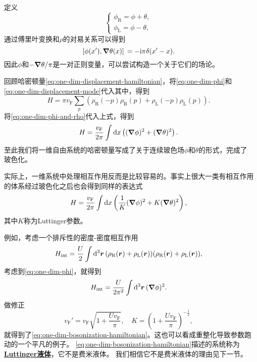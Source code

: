 \documentclass[hyperref, UTF8, a4paper]{ctexart}
\newcommand*{\ii}{\mathrm{i}}
\newcommand*{\concept}[1]{\underline{\textbf{#1}}}
\begin{document}
定义
\begin{equation}
    \begin{cases}
        {\phi}_\text{R} = {\phi} + {\theta}, \\
        {\phi}_\text{L} = {\phi} - {\theta},
    \end{cases}
\end{equation}
通过傅里叶变换和${\rho}$的对易关系可以得到
\begin{equation}
    \comm*{{\phi}(x')}{\grad {\theta}(x)} = -\ii \pi \delta(x' - x).
\end{equation}
因此$\phi$和$- \grad{\theta} / \pi$是一对正则变量，可以尝试构造一个关于它们的场论。

回顾哈密顿量\eqref{eq:one-dim-displacement-hamiltonian}，将\eqref{eq:one-dim-phi}和\eqref{eq:one-dim-displacement-mode}代入其中，得到
\[
    {H} = \pi v_\text{F} \sum_p \left( {\rho}_\text{R}(-p) {\rho}_\text{R}(p) + {\rho}_\text{L}(-p) {\rho}_\text{L}(p) \right).
\]
将\eqref{eq:one-dim-phi-and-rho}代入上式，得到
\begin{equation}
    H = \frac{v_\text{F}}{2\pi} \int \dd{x} \left( (\grad{\phi})^2 + (\grad{\theta})^2 \right).
\end{equation}
至此我们将一维自由系统的哈密顿量写成了关于连续玻色场$\phi$和$\theta$的形式，完成了玻色化。

实际上，一维系统中处理相互作用反而是比较容易的。事实上很大一类有相互作用的体系经过玻色化之后也会得到同样的表达式
\begin{equation}
    H = \frac{v_\text{F}}{2\pi} \int \dd{x} \left( \frac{1}{K} (\grad{\phi})^2 + K (\grad{\theta})^2 \right),
    \label{eq:one-dim-bosonization-hamiltonian}
\end{equation}
其中$K$称为Luttinger参数。

例如，考虑一个排斥性的密度-密度相互作用
\begin{equation}
    {H}_\text{int} = \frac{U}{2} \int \dd[3]{\vb*{r}} ({\rho}_\text{R}(\vb*{r}) + {\rho}_\text{L}(\vb*{r})) ({\rho}_\text{R}(\vb*{r}) + {\rho}_\text{L}(\vb*{r})),
\end{equation}
考虑到\eqref{eq:one-dim-phi}，就得到
\begin{equation}
    {H}_\text{int} = \frac{U}{2\pi^2} \int \dd[3]{\vb*{r}} (\grad{\phi})^2.
\end{equation}
做修正
\begin{equation}
    v_\text{F}' = v_\text{F} \sqrt{1 + \frac{U v_\text{F}}{\pi}}, \quad K = \left( 1 + \frac{U v_\text{F}}{\pi} \right)^{- \frac{1}{2}},
\end{equation}
就得到了\eqref{eq:one-dim-bosonization-hamiltonian}。这也可以看成重整化导致参数跑动的一个平凡的例子。
\eqref{eq:one-dim-bosonization-hamiltonian}描述的系统称为\concept{Luttinger液体}，它不是费米液体。
我们相信它不是费米液体的理由见下一节。
\end{document}
